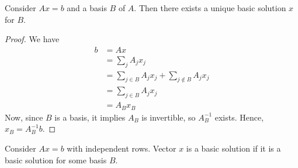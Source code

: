     \begin{theorem}[]
        Consider $Ax = b$ and a basis $B$ of $A$. Then there exists a unique basic solution $x$ for $B$.
    \end{theorem}
    \begin{proof}[Proof]
        We have
        \begin{align*}
            b & = Ax                                                                   \\
              & = \sum_j A_j x_j                                                       \\
              & = \sum_{j \in B} A_jx_j + \sum_{j \not \in B} A_jx_j                   \\
              & = \sum_{j \in B} A_jx_j  \tag*{Since $x_j = 0$ for all $j \not \in B$} \\
              & = A_Bx_B
        \end{align*}
        Now, since $B$ is a basis, it implies $A_B$ is invertible, so $A^{-1}_B$ exists. Hence, $x_B = A^{-1}_B b$.
    \end{proof}
    \begin{definition}
        Consider $Ax = b$ with independent rows. Vector $x$ is a basic solution if it is a basic solution for some basis $B$.
    \end{definition}
